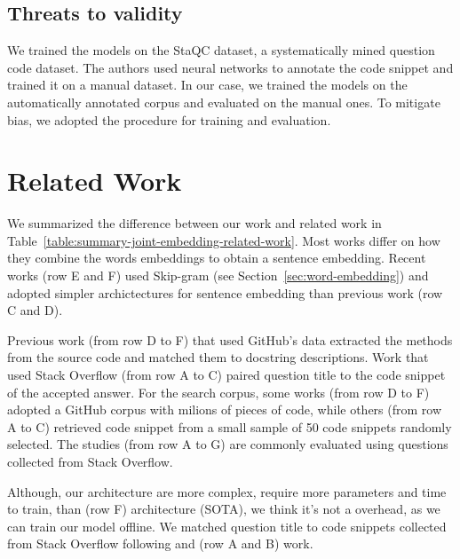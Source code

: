\documentclass[sigconf]{acmart}
\begin{document}
\subsection{Threats to validity}

We trained the models on the StaQC dataset, a systematically mined question code dataset. The authors used neural networks to annotate the code snippet and trained it on a manual dataset. In our case, we trained the models on the automatically annotated corpus and evaluated on the manual ones. To mitigate bias, we adopted the \citet{iyer-etal-2016-summarizing} procedure for training and evaluation.

\section{Related Work}

We summarized the difference between our work and related work in Table~\ref{table:summary-joint-embedding-related-work}. Most works differ on how they combine the words embeddings to obtain a sentence embedding. Recent works (row E and F) used Skip-gram (see Section~\ref{sec:word-embedding}) and adopted simpler archictectures for sentence embedding than previous work (row C and D).  

Previous work (from row D to F) that used GitHub's data extracted the methods from the source code and matched them to docstring descriptions. Work that used Stack Overflow  (from row A to C) paired question title to the code snippet of the accepted answer. For the search corpus, some works (from row D to F) adopted a GitHub corpus with milions of pieces of code, while others  (from row A to C) retrieved code snippet from a small sample of 50 code snippets randomly selected. The studies (from row A to G) are commonly evaluated using questions collected from Stack Overflow. 

Although, our architecture are more complex, require more parameters and time to train, than \citet{cambronero-deep-code-search-2019} (row F) architecture (SOTA), we think it's not a overhead, as we can train our model offline. We matched question title to code snippets collected from Stack Overflow following \citet{Allamanis-bimodal-source-code-natural-language:2015} and \citet{iyer-etal-2016-summarizing} (row A and B) work. 
\end{document}
